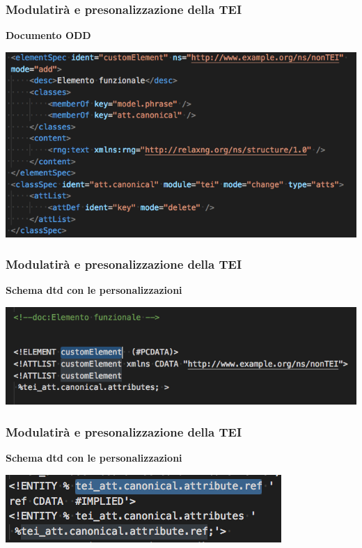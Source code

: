 \begin{frame}
    \frametitle{Modulatirà e presonalizzazione della TEI}
    \addtocounter{nframe}{1}
    
    \textbf{Documento ODD}

     \begin{center}
        \includegraphics[width=.97\textwidth]{imgs/CustomizationODD-2.png}
     \end{center}
    
\end{frame}

\begin{frame}
    \frametitle{Modulatirà e presonalizzazione della TEI}
    \addtocounter{nframe}{1}
    
    \textbf{Schema dtd con le personalizzazioni}

     \begin{center}
        \includegraphics[width=.97\textwidth]{imgs/TEI-Custom-DTD.png}
     \end{center}
   
    
\end{frame}

\begin{frame}
    \frametitle{Modulatirà e presonalizzazione della TEI}
    \addtocounter{nframe}{1}
    
    \textbf{Schema dtd con le personalizzazioni}

     \begin{center}
        \includegraphics[width=.9\textwidth]{imgs/TEI-Custom-DTD-2.png}
     \end{center}
   
    
\end{frame}



